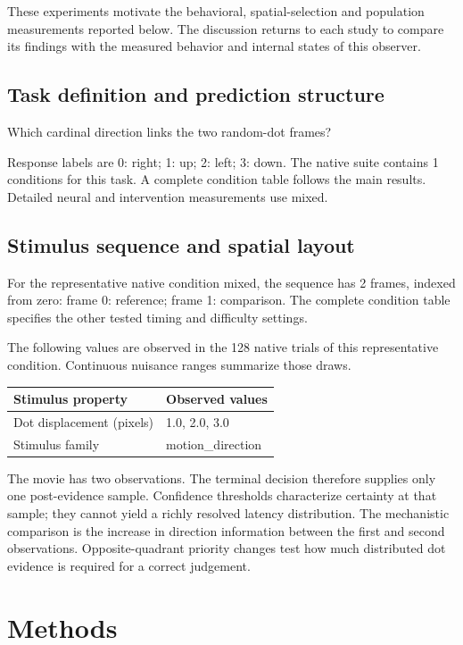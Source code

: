 \documentclass[11pt]{article}
\begin{document}
These experiments motivate the behavioral, spatial-selection and population measurements reported below. The discussion returns to each study to compare its findings with the measured behavior and internal states of this observer.
\subsection{Task definition and prediction structure}
Which cardinal direction links the two random-dot frames?

Response labels are 0: right; 1: up; 2: left; 3: down. The native suite contains 1 conditions for this task. A complete condition table follows the main results. Detailed neural and intervention measurements use mixed.

\subsection{Stimulus sequence and spatial layout}
For the representative native condition mixed, the sequence has 2 frames, indexed from zero: frame 0: reference; frame 1: comparison. The complete condition table specifies the other tested timing and difficulty settings.

The following values are observed in the 128 native trials of this representative condition. Continuous nuisance ranges summarize those draws.
\begin{center}\small\begin{tabular}{p{}p{}}\toprule Stimulus property & Observed values\\\midrule
Dot displacement (pixels) & 1.0, 2.0, 3.0\\
Stimulus family & motion\_\allowbreak{}direction\\
\bottomrule\end{tabular}\normalsize\end{center}
The movie has two observations. The terminal decision therefore supplies only one post-evidence sample. Confidence thresholds characterize certainty at that sample; they cannot yield a richly resolved latency distribution. The mechanistic comparison is the increase in direction information between the first and second observations. Opposite-quadrant priority changes test how much distributed dot evidence is required for a correct judgement.


\section{Methods}
\end{document}
